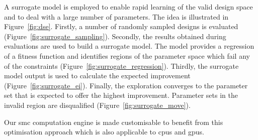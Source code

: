 A surrogate model is employed to enable rapid learning of the valid design space and to deal with a large number of parameters.
The idea is illustrated in Figure~\ref{fig:dse}.
Firstly, a number of randomly sampled designs is evaluated (Figure~\ref{fig:surrogate_sampling}).
Secondly, the results obtained during evaluations are used to build a surrogate model.
The model provides a regression of a fitness function and identifies regions of the parameter space which fail any of the constraints (Figure~\ref{fig:surrogate_regression}).
Thirdly, the surrogate model output is used to calculate the expected improvement (Figure~\ref{fig:surrogate_ei}).
Finally, the exploration converges to the parameter set that is expected to offer the highest improvement.
Parameter sets in the invalid region are disqualified (Figure~\ref{fig:surrogate_move}).

Our \gls{smc} computation engine is made customisable to benefit from this optimisation approach which is also applicable to \glspl{cpu} and \glspl{gpu}. 

